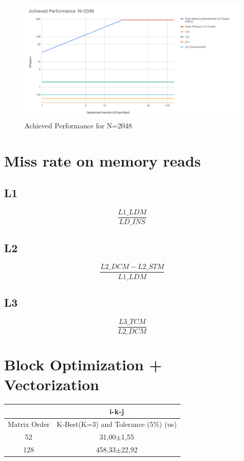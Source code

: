 \documentclass{article}
\begin{document}
\begin{appendices}
\begin{figure}[H]
    \centering
    \includegraphics[width=15cm]{Pictures/roofline_ap_2048.png}
    \caption{Achieved Performance for N=2048}
    \label{fig:roofline_ap_2048}
\end{figure}

\section{Miss rate on memory reads}
\label{miss_rate}
\subsection{L1}
\begin{equation}
\frac{L1\_LDM}{LD\_INS}
\end{equation}

\subsection{L2}
\begin{equation}
\frac{L2\_DCM-L2\_STM}{L1\_LDM}
\end{equation}

\subsection{L3}
\begin{equation}
\frac{L3\_TCM}{L2\_DCM}
\end{equation}

\section{Block Optimization + Vectorization}

\begin{tabular}{|c|c|}
\hline
              & i-k-j \\
\hline
Matrix Order  & K-Best(K=3) and Tolerance (5\%) (us)  \\ 
\hline \hline
 52           & 31,00$\pm$1,55 \\
\hline
 128          & 458,33$\pm$22,92 \\
\hline
\end{tabular}


\end{appendices}
\end{document}
